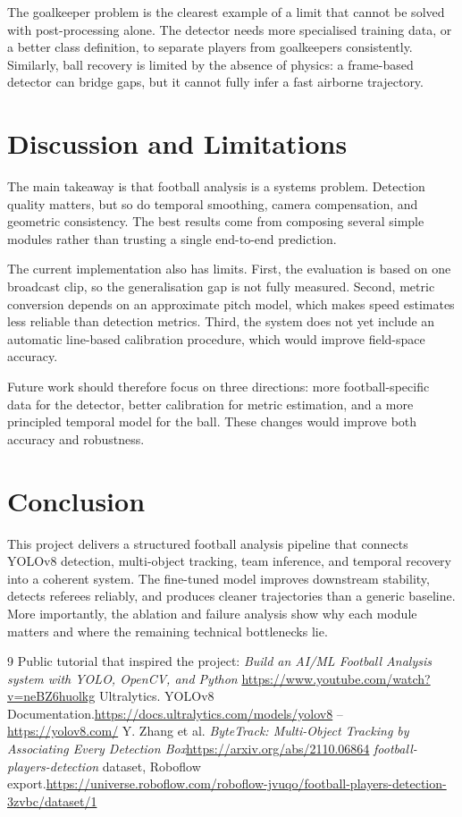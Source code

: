 \documentclass[11pt,a4paper]{article}
\begin{document}
The goalkeeper problem is the clearest example of a limit that cannot be solved with post-processing alone. The detector needs more specialised training data, or a better class definition, to separate players from goalkeepers consistently. Similarly, ball recovery is limited by the absence of physics: a frame-based detector can bridge gaps, but it cannot fully infer a fast airborne trajectory.

\section{Discussion and Limitations}
The main takeaway is that football analysis is a systems problem. Detection quality matters, but so do temporal smoothing, camera compensation, and geometric consistency. The best results come from composing several simple modules rather than trusting a single end-to-end prediction.

The current implementation also has limits. First, the evaluation is based on one broadcast clip, so the generalisation gap is not fully measured. Second, metric conversion depends on an approximate pitch model, which makes speed estimates less reliable than detection metrics. Third, the system does not yet include an automatic line-based calibration procedure, which would improve field-space accuracy.

Future work should therefore focus on three directions: more football-specific data for the detector, better calibration for metric estimation, and a more principled temporal model for the ball. These changes would improve both accuracy and robustness.

\section{Conclusion}
This project delivers a structured football analysis pipeline that connects YOLOv8 detection, multi-object tracking, team inference, and temporal recovery into a coherent system. The fine-tuned model improves downstream stability, detects referees reliably, and produces cleaner trajectories than a generic baseline. More importantly, the ablation and failure analysis show why each module matters and where the remaining technical bottlenecks lie.

\begin{thebibliography}{9}
 Public tutorial that inspired the project: \textit{Build an AI/ML Football Analysis system with YOLO, OpenCV, and Python}
\newline \url{https://www.youtube.com/watch?v=neBZ6huolkg}
 Ultralytics. YOLOv8 Documentation.\newline \url{https://docs.ultralytics.com/models/yolov8} -- \url{https://yolov8.com/}
 Y. Zhang et al. \textit{ByteTrack: Multi-Object Tracking by Associating Every Detection Box}\newline \url{https://arxiv.org/abs/2110.06864}
 \textit{football-players-detection} dataset, Roboflow export.\newline \url{https://universe.roboflow.com/roboflow-jvuqo/football-players-detection-3zvbc/dataset/1}
\end{thebibliography}
\end{document}
